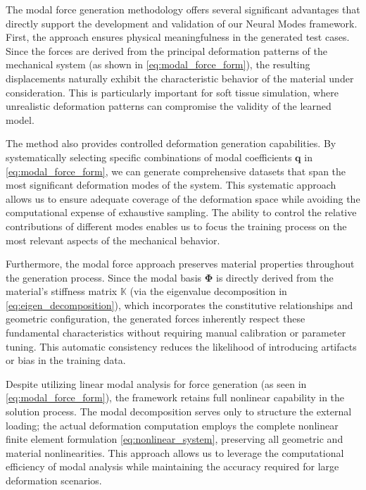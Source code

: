 The modal force generation methodology offers several significant advantages that directly support the development and validation of our Neural Modes framework. First, the approach ensures physical meaningfulness in the generated test cases. Since the forces are derived from the principal deformation patterns of the mechanical system (as shown in \eqref{eq:modal_force_form}), the resulting displacements naturally exhibit the characteristic behavior of the material under consideration. This is particularly important for soft tissue simulation, where unrealistic deformation patterns can compromise the validity of the learned model.

The method also provides controlled deformation generation capabilities. By systematically selecting specific combinations of modal coefficients $\bm{q}$ in \eqref{eq:modal_force_form}, we can generate comprehensive datasets that span the most significant deformation modes of the system. This systematic approach allows us to ensure adequate coverage of the deformation space while avoiding the computational expense of exhaustive sampling. The ability to control the relative contributions of different modes enables us to focus the training process on the most relevant aspects of the mechanical behavior.

Furthermore, the modal force approach preserves material properties throughout the generation process. Since the modal basis $\boldsymbol{\Phi}$ is directly derived from the material's stiffness matrix $\mathbb{K}$ (via the eigenvalue decomposition in \eqref{eq:eigen_decomposition}), which incorporates the constitutive relationships and geometric configuration, the generated forces inherently respect these fundamental characteristics without requiring manual calibration or parameter tuning. This automatic consistency reduces the likelihood of introducing artifacts or bias in the training data.

Despite utilizing linear modal analysis for force generation (as seen in \eqref{eq:modal_force_form}), the framework retains full nonlinear capability in the solution process. The modal decomposition serves only to structure the external loading; the actual deformation computation employs the complete nonlinear finite element formulation \eqref{eq:nonlinear_system}, preserving all geometric and material nonlinearities. This approach allows us to leverage the computational efficiency of modal analysis while maintaining the accuracy required for large deformation scenarios.

